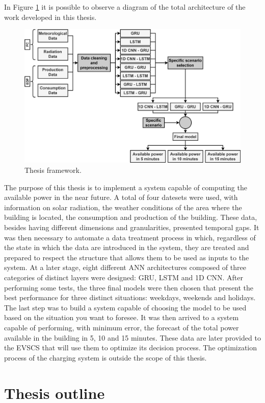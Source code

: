 In Figure \ref{scope} it is possible to observe a diagram of the total architecture of the work developed in this thesis. 

\begin{figure}[h!]
    \centering
    \begin{center}
    \includegraphics[width=1\textwidth]{Images/Work.png}
    \caption{Thesis framework.}
    \label{scope}
    \end{center}
\end{figure}

The purpose of this thesis is to implement a system capable of computing the available power in the near future. A total of four datesets were used, with information on solar radiation, the weather conditions of the area where the building is located, the consumption and production of the building. These data, besides having different dimensions and granularities, presented temporal gaps. It was then necessary to automate a data treatment process in which, regardless of the state in which the data are introduced in the system, they are treated and prepared to respect the structure that allows them to be used as inputs to the system. At a later stage, eight different \ac{ANN} architectures composed of three categories of distinct layers were designed: \ac{GRU}, \ac{LSTM} and \ac{1D CNN}. After performing some tests, the three final models were then chosen that present the best performance for three distinct situations: weekdays, weekends and holidays. The last step was to build a system capable of choosing the model to be used based on the situation you want to foresee. It was then arrived to a system capable of performing, with minimum error, the forecast of the total power available in the building in 5, 10 and 15 minutes. These data are later provided to the \ac{EVSCS} that will use them to optimize its decision process. The optimization process of the charging system is outside the scope of this thesis.





\section{Thesis outline}